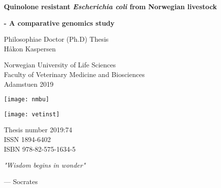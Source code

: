 \frontmatter
{}
{
\pagestyle{empty}
\graphicspath{ {./images/pdfs/} }
\begin{titlepage}
   \begin{center}
       
       \huge
       
       \textbf{Quinolone resistant \textit{Escherichia coli} from Norwegian livestock}
       
       \LARGE
       
       \textbf{- A comparative genomics study}
 
       \vspace{1.5cm}
       
       \large
       Philosophiae Doctor (Ph.D) Thesis\\
       Håkon Kaspersen
 
       \vspace{1cm}
       
       Norwegian University of Life Sciences\\
       Faculty of Veterinary Medicine and Biosciences\\
       Adamstuen 2019
       
       \texttt{[image: nmbu]}
       
       \vspace{1cm}
       
       \texttt{[image: vetinst]}
       
       \vfill

 
       \vspace{1cm}
       \normalsize
 
       Thesis number 2019:74\\
       ISSN 1894-6402\\
       ISBN 978-82-575-1634-5
 
   \end{center}
\end{titlepage}

\begin{titlepage}
   \null
   \vspace*{\fill}
   \renewcommand{\epigraphsize}{\large}
   \epigraph{\textit{"Wisdom begins in wonder"}}{--- \textup{Socrates}}
\end{titlepage}
}
